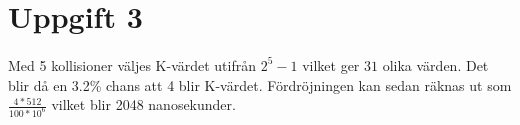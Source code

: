 \section{Uppgift 3}
\paragraph{}
Med 5 kollisioner väljes K-värdet utifrån $2^5-1$ vilket ger $31$ olika värden. 
Det blir då en 3.2\% chans att 4 blir K-värdet.
Fördröjningen kan sedan räknas ut som $\frac{4*512}{100*10^6}$ vilket blir 2048 nanosekunder.
